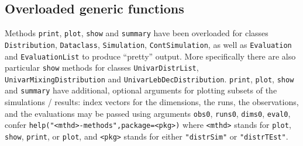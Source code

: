 \documentclass[11pt]{article}
\newcommand{\code}[1]{{\tt #1}}
\newcommand{\pkg}[1]{{\tt "#1"}}
\begin{document}
\subsection{Overloaded generic functions}
Methods \code{print}, \code{plot}, \code{show} and \code{summary} have been
overloaded for classes \code{Distribution}, \code{Dataclass}, \code{Simulation},
\code{ContSimulation}, as well as \code{Evaluation} and \code{EvaluationList} to
produce ``pretty''  output.
More specifically there are also particular \code{show} methods
for classes \code{UnivarDistrList}, \code{UnivarMixingDistribution} and
\code{UnivarLebDecDistribution}.
\code{print}, \code{plot}, \code{show} and \code{summary} have additional,
optional arguments for plotting subsets of the simulations / results:
index vectors for the dimensions, the runs, the observations, and the
evaluations may be passed using arguments \code{obs0},  \code{runs0},
\code{dims0}, \code{eval0}, confer
\code{help("<mthd>-methods",package=<pkg>)} where \code{<mthd>} stands for
\code{plot}, \code{show}, \code{print}, or \code{plot}, and \code{<pkg>} stands
for either \pkg{distrSim} or \pkg{distrTEst}.
\end{document}
